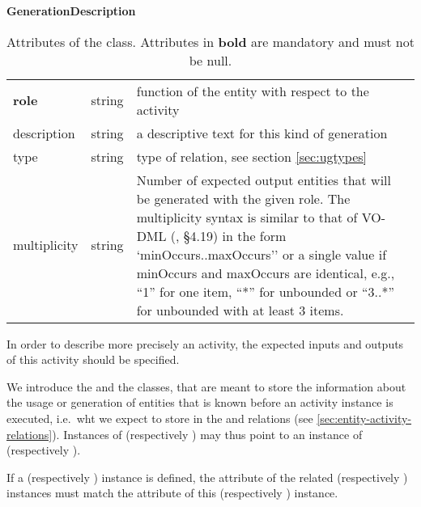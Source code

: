 \begin{table}[ht]
\small
{}\textwidth
\textbf{\normalsize GenerationDescription}\vspace{0.25em}\\
\begin{tabulary}{1.0\textwidth}{llL}
\toprule
{} &  & \\
\midrule
\textbf{role} & string & function of the entity with respect to the activity \\
description  & string & a descriptive text for this kind of generation \\
type & string   & type of relation, see section \ref{sec:ugtypes} \\
multiplicity & string & Number of expected output entities that will be generated with the given role. The multiplicity syntax is similar to that of VO-DML (\citealt{2018ivoa.spec.0910L}, \S4.19) in the form `minOccurs..maxOccurs'' or a single value if minOccurs and maxOccurs are identical, e.g., ``1'' for one item, ``*'' for unbounded or ``3..*'' for unbounded with at least 3 items. \\
\bottomrule
\end{tabulary}
\caption[Attributes of the  class]{Attributes of the  class. Attributes in \textbf{bold} are mandatory and must not be null.}
\label{tab:wasgeneratedbydescription}
\end{table}


In order to describe more precisely an activity, the expected inputs and outputs of this activity should be specified.

We introduce the  and the  classes, that are meant to store the information about the usage or generation of entities that is known before an activity instance is executed, i.e.~wht we expect to store in the  and  relations (see \ref{sec:entity-activity-relations}).
Instances of  (respectively ) may thus point to an instance of  (respectively ).

If a  (respectively ) instance is defined, the  attribute of the related  (respectively ) instances must match the  attribute of this  (respectively ) instance.

